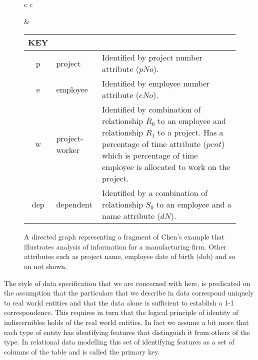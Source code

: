 \documentclass[10pt,a4paper]{article}
\begin{document}
\begin{figure} [H]  %
\begin{center}
\begin{tabular}{c c}
\barsfalse %

& \footnotesize
\begin{tabular}{c p{1.5cm} p{4cm}}
KEY && \\
\hline
p & project & Identified by project number attribute ($pNo$).\\
e & employee & Identified by employee number attribute ($eNo$). \\
w  & project-worker & Identified by combination of relationship $R_0$ to an employee and relationship $R_1$ to a project. Has a percentage of time attribute ($pcnt$) which is percentage of time employee is allocated to work on the project.\\
dep & dependent & Identified by a combination of relationship $S_0$ to an employee and a name attribute ($dN$).\\
\end{tabular} 
\end{tabular}
\end{center}
\caption{A directed graph representing a fragment of Chen's example that illustrates analysis of information for a manufacturing firm. Other attributes such as project name, employee date of birth (dob) and so on not shown.}
\label{chenfragmentSANSbars}
\end{figure}

The style of data specification that we are concerned with here, is 
predicated on the assumption that the particulars that we describe in data 
correspond uniquely to real world entities and that the data 
alone is sufficient to establish a 1-1 correspondence. 
This requires in turn that the logical principle of identity of 
indiscernibles holds of the real world entities. In fact we assume a bit more 
that each type of entity has identifying features that distinguish it from  
others of the type. 
In relational data modelling this set of identifying features as a set of columns of the table and is called the primary key.  
\end{document}
